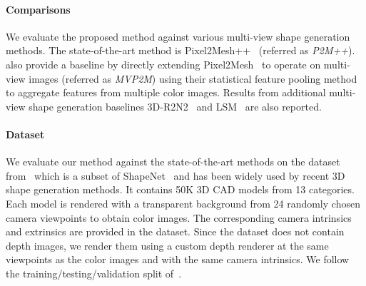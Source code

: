 \paragraph{Comparisons}
We evaluate the proposed method against various multi-view shape generation methods.
The state-of-the-art method is Pixel2Mesh++~\cite{wen2019pixel2mesh++} (referred as \emph{P2M++}). \cite{wen2019pixel2mesh++} also provide a baseline by directly extending Pixel2Mesh~\cite{wang2018pixel2mesh} to operate on multi-view images (referred as \emph{MVP2M}) using their statistical feature pooling method to aggregate features from multiple color images.
Results from additional multi-view shape generation baselines 3D-R2N2~\cite{3dr2n2} and LSM~\cite{kar2017lsm} are also reported.

\paragraph{Dataset}\vspace{-4mm}
We evaluate our method against the state-of-the-art methods on the dataset from~\cite{3dr2n2}
which is a subset of ShapeNet~\cite{chang2015shapenet} and has been widely used by recent 3D shape generation methods.
It contains 50K 3D CAD models from 13 categories.
Each model is rendered with a transparent background from 24 randomly chosen camera viewpoints to obtain color images.
The corresponding camera intrinsics and extrinsics are provided in the dataset.
Since the dataset does not contain depth images, we render them using a custom depth renderer at the same viewpoints as the color images and with the same camera intrinsics.
We follow the training/testing/validation split of~\cite{gkioxari2019meshrcnn}.


